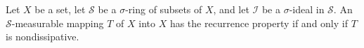 Let $X$ be a set, let $\mathcal{S}$ be a $\sigma$-ring of subsets of $X$, and let $\mathcal{I}$ be a $\sigma$-ideal in $\mathcal{S}$. An $\mathcal{S}$-measurable mapping $T$ of $X$ into $X$ has the recurrence property if and only if $T$ is nondissipative.